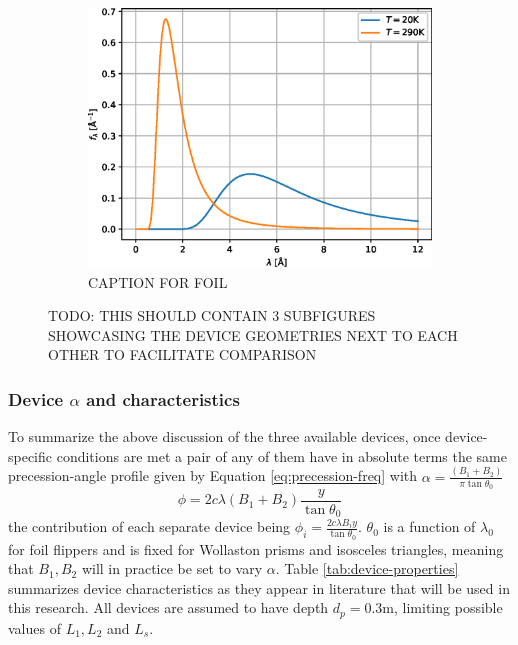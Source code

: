 \documentclass{article}
\begin{document}
\begin{figure}[htbp]
\begin{subfigure}[b]{0.3\textwidth}
		\includegraphics[width=\textwidth]{source-spectrum}
		\caption{CAPTION FOR FOIL}
		\label{fig:precession-devices:foil}
	\end{subfigure}
	\caption{TODO: THIS SHOULD CONTAIN 3 SUBFIGURES SHOWCASING THE DEVICE GEOMETRIES NEXT TO EACH OTHER TO FACILITATE COMPARISON}
	\label{fig:precession-devices}
\end{figure}

\subsubsection{Device $\alpha$ and characteristics}
To summarize the above discussion of the three available devices, once device-specific conditions are met a pair of any of them have in absolute terms the same precession-angle profile given by Equation \eqref{eq:precession-freq} with $\alpha = \frac{(B_1 + B_2)}{\pi\tan\theta_0}$
\begin{equation}
	\phi = 2c\lambda (B_1 + B_2)\frac{y}{\tan\theta_0} \label{eq:device-prec}
\end{equation}
the contribution of each separate device being $\phi_i = \frac{2c\lambda B_i y}{\tan\theta_0}$. $\theta_0$ is a function of $\lambda_0$ for foil flippers and is fixed for Wollaston prisms and isosceles triangles, meaning that $B_1, B_2$ will in practice be set to vary $\alpha$. Table \ref{tab:device-properties} summarizes device characteristics as they appear in literature that will be used in this research. All devices are assumed to have depth $d_p = 0.3 \unit{\meter}$, limiting possible values of $L_1, L_2$ and $L_s$. 
\end{document}
